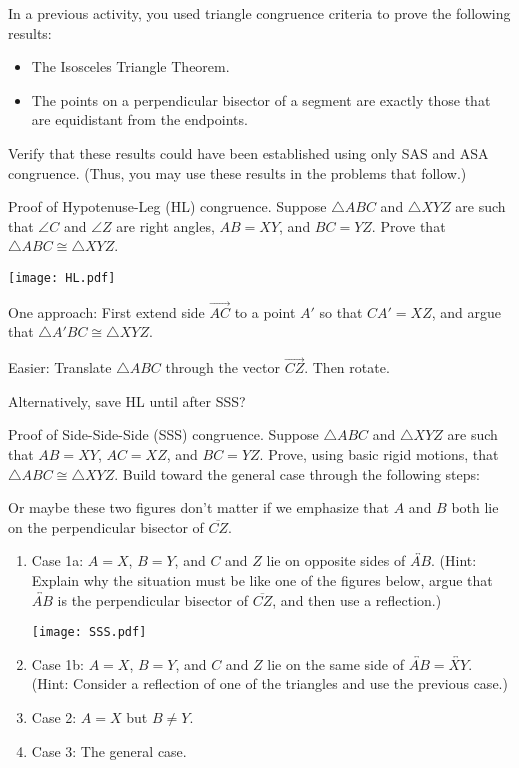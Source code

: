 \documentclass{ximera}
\begin{document}
\begin{problem}
In a previous activity, you used triangle congruence criteria to prove the following results: 
\begin{itemize}
\item The Isosceles Triangle Theorem.
\item The points on a perpendicular bisector of a segment are exactly those that are equidistant from the endpoints.
\end{itemize}
Verify that these results could have been established using only SAS and ASA congruence.  (Thus, you may use these results in the problems that follow.) 
\end{problem}

\begin{problem}
Proof of Hypotenuse-Leg (HL) congruence.  Suppose $\triangle ABC$ and $\triangle XYZ$ are such that $\angle C$ and $\angle Z$ are right angles, $AB=XY$, and $BC=YZ$.  Prove that $\triangle ABC \cong \triangle XYZ$.  
\begin{image}
\texttt{[image: HL.pdf]}
\end{image}
\end{problem}

\begin{teachingnote}
One approach:  First extend side $\overrightarrow{AC}$ to a point $A'$ so that $CA'=XZ$, and argue that $\triangle A'BC \cong \triangle XYZ$.

Easier:  Translate $\triangle ABC$ through the vector $\overrightarrow{CZ}$.  Then rotate.

Alternatively, save HL until after SSS?
\end{teachingnote}


\begin{problem}
Proof of Side-Side-Side (SSS) congruence.  Suppose $\triangle ABC$ and $\triangle XYZ$ are such that $AB=XY$, $AC=XZ$, and $BC=YZ$.  Prove, using basic rigid motions, that $\triangle ABC \cong \triangle XYZ$.  Build toward the general case through the following steps:  
\begin{teachingnote}
Or maybe these two figures don't matter if we emphasize that $A$ and $B$ both lie on the perpendicular bisector of $\overline{CZ}$.
\end{teachingnote}
\begin{enumerate}
\item Case 1a:  $A=X$, $B=Y$, and $C$ and $Z$ lie on opposite sides of $\overleftrightarrow{AB}$.  (Hint:  Explain why the situation must be like one of the figures below, argue that $\overleftrightarrow{AB}$ is the perpendicular bisector of $\overline{CZ}$, and then use a reflection.)
\begin{image}
\texttt{[image: SSS.pdf]}
\end{image}
\item Case 1b:  $A=X$, $B=Y$, and $C$ and $Z$ lie on the same side of $\overleftrightarrow{AB}=\overleftrightarrow{XY}$.  (Hint: Consider a reflection of one of the triangles and use the previous case.)  
\item Case 2:  $A=X$ but $B \ne Y$.
\item Case 3: The general case.  
\end{enumerate}
\end{problem}
\end{document}
